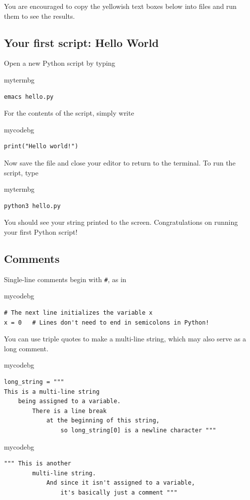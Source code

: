 You are encouraged to copy the yellowish text boxes below into files and run them to see the results.

\subsection{Your first script: Hello World}
Open a new Python script by typing
\begin{tsession}{mytermbg}
\begin{verbatim}
emacs hello.py
\end{verbatim}
\end{tsession}
For the contents of the script, simply write
\begin{tsession}{mycodebg}
\begin{verbatim}
print("Hello world!")
\end{verbatim}
\end{tsession}
Now save the file and close your editor to return to the terminal.
To run the script, type
\begin{tsession}{mytermbg}
\begin{verbatim}
python3 hello.py
\end{verbatim}
\end{tsession}
You should see your string printed to the screen.
Congratulations on running your first Python script!

\subsection{Comments}
Single-line comments begin with \texttt{\#}, as in
\begin{tsession}{mycodebg}
\begin{verbatim}
# The next line initializes the variable x
x = 0   # Lines don't need to end in semicolons in Python!
\end{verbatim}
\end{tsession}
You can use triple quotes to make a multi-line string, which may also serve as a long comment.
\begin{tsession}{mycodebg}
\begin{verbatim}
long_string = """
This is a multi-line string
    being assigned to a variable.
        There is a line break
            at the beginning of this string,
                so long_string[0] is a newline character """
\end{verbatim}
\end{tsession}
\begin{tsession}{mycodebg}
\begin{verbatim}
""" This is another
        multi-line string.
            And since it isn't assigned to a variable,
                it's basically just a comment """
\end{verbatim}
\end{tsession}

